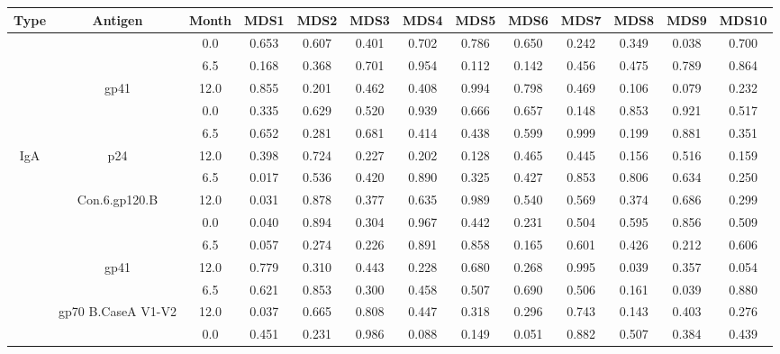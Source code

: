 \documentclass[12pt]{article} %
\begin{document}
 
\begin{tabular}{ccccccccccccc}
\toprule
Type & Antigen & Month & MDS1 & MDS2 & MDS3 & MDS4 & MDS5 & MDS6 & MDS7 & MDS8 & MDS9 & MDS10\\
\midrule
 &  & 0.0 & 0.653 & 0.607 & 0.401 & 0.702 & 0.786 & 0.650 & 0.242 & 0.349 & 0.038 & 0.700\\
\cmidrule{3-13}
 &  & 6.5 & 0.168 & 0.368 & 0.701 & 0.954 & 0.112 & 0.142 & 0.456 & 0.475 & 0.789 & 0.864\\
\cmidrule{3-13}
 & \multirow{-3}{*}{\centering\arraybackslash gp41} & 12.0 & 0.855 & 0.201 & 0.462 & 0.408 & 0.994 & 0.798 & 0.469 & 0.106 & 0.079 & 0.232\\
\cmidrule{2-13}
 &  & 0.0 & 0.335 & 0.629 & 0.520 & 0.939 & 0.666 & 0.657 & 0.148 & 0.853 & 0.921 & 0.517\\
\cmidrule{3-13}
 &  & 6.5 & 0.652 & 0.281 & 0.681 & 0.414 & 0.438 & 0.599 & 0.999 & 0.199 & 0.881 & 0.351\\
\cmidrule{3-13}
\multirow{-6}{*}{\centering\arraybackslash IgA} & \multirow{-3}{*}{\centering\arraybackslash p24} & 12.0 & 0.398 & 0.724 & 0.227 & 0.202 & 0.128 & 0.465 & 0.445 & 0.156 & 0.516 & 0.159\\
\cmidrule{1-13}
 &  & 6.5 & 0.017 & 0.536 & 0.420 & 0.890 & 0.325 & 0.427 & 0.853 & 0.806 & 0.634 & 0.250\\
\cmidrule{3-13}
 & \multirow{-2}{*}{\centering\arraybackslash Con.6.gp120.B} & 12.0 & 0.031 & 0.878 & 0.377 & 0.635 & 0.989 & 0.540 & 0.569 & 0.374 & 0.686 & 0.299\\
\cmidrule{2-13}
 &  & 0.0 & 0.040 & 0.894 & 0.304 & 0.967 & 0.442 & 0.231 & 0.504 & 0.595 & 0.856 & 0.509\\
\cmidrule{3-13}
 &  & 6.5 & 0.057 & 0.274 & 0.226 & 0.891 & 0.858 & 0.165 & 0.601 & 0.426 & 0.212 & 0.606\\
\cmidrule{3-13}
 & \multirow{-3}{*}{\centering\arraybackslash gp41} & 12.0 & 0.779 & 0.310 & 0.443 & 0.228 & 0.680 & 0.268 & 0.995 & 0.039 & 0.357 & 0.054\\
\cmidrule{2-13}
 &  & 6.5 & 0.621 & 0.853 & 0.300 & 0.458 & 0.507 & 0.690 & 0.506 & 0.161 & 0.039 & 0.880\\
\cmidrule{3-13}
 & \multirow{-2}{*}{\centering\arraybackslash gp70 B.CaseA V1-V2} & 12.0 & 0.037 & 0.665 & 0.808 & 0.447 & 0.318 & 0.296 & 0.743 & 0.143 & 0.403 & 0.276\\
\cmidrule{2-13}
 &  & 0.0 & 0.451 & 0.231 & 0.986 & 0.088 & 0.149 & 0.051 & 0.882 & 0.507 & 0.384 & 0.439\\
\cmidrule{3-13}

\end{tabular}
\end{document}
